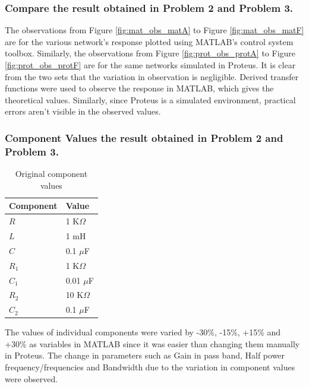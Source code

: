 \documentclass{lab_sheet}
\begin{document}
\pagebreak
\subsubsection*{Compare the result obtained in Problem 2 and Problem 3.}
The observations from Figure \ref{fig:mat_obs_matA} to Figure \ref{fig:mat_obs_matF} are for the various network's response plotted using MATLAB's control system toolbox. Similarly, the observations from Figure \ref{fig:prot_obs_protA} to Figure \ref{fig:prot_obs_protF} are for the same networks simulated in Proteus. It is clear from the two sets that the variation in observation is negligible. Derived transfer functions were used to observe the response in MATLAB, which gives the theoretical values. Similarly, since Proteus is a simulated environment, practical errors aren't visible in the observed values.
\subsubsection*{Component Values  the result obtained in Problem 2 and Problem 3.}
\begin{table}[H]
   \centering
   \begin{tabular}{||M{3.5cm}||M{3cm}||}
      \hline
      \textbf{Component}&\textbf{Value}\\
      \hline
      $R$&1 K$\Omega$\\
      \hline
      $L$&1 mH\\
      \hline
      $C$&0.1 $\mu$F\\
      \hline
      $R_1$&1 K$\Omega$\\
      \hline
      $C_1$&0.01 $\mu$F\\
      \hline
      $R_2$&10 K$\Omega$\\
      \hline
      $C_2$&0.1 $\mu$F\\
      \hline
   \end{tabular}
   \caption{Original component values}
   \label{tbl:value}
\end{table}
The values of individual components were varied by -30\%, -15\%, +15\% and +30\% as variables in MATLAB since it was easier than changing them manually in Proteus. The change in parameters such as Gain in pass band, Half power frequency/frequencies and Bandwidth due to the variation in component values were observed.
\end{document}
